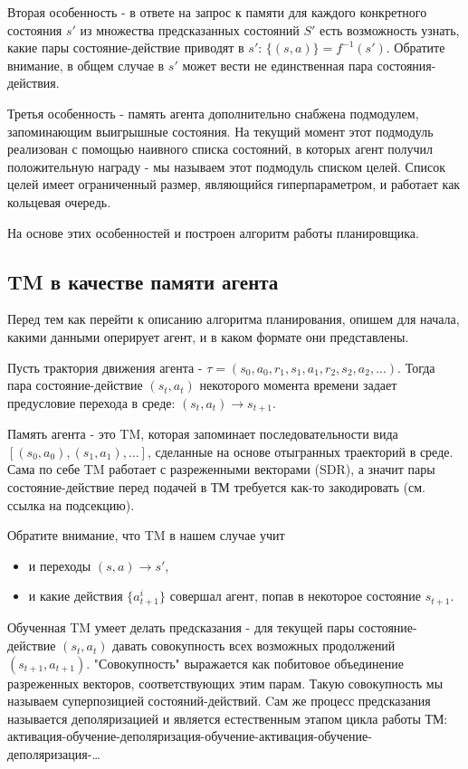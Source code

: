 \documentclass[a4paper]{article}
\begin{document}
Вторая особенность - в ответе на запрос к памяти для каждого конкретного состояния $s'$ из множества предсказанных состояний $S'$ есть возможность узнать, какие пары состояние-действие приводят в $s'$: $\{(s, a)\} = f^{-1}(s')$. Обратите внимание, в общем случае в $s'$ может вести не единственная пара состояния-действия.

Третья особенность - память агента дополнительно снабжена подмодулем, запоминающим выигрышные состояния. На текущий момент этот подмодуль реализован с помощью наивного списка состояний, в которых агент получил положительную награду - мы называем этот подмодуль списком целей. Список целей имеет ограниченный размер, являющийся гиперпараметром, и работает как кольцевая очередь.

На основе этих особенностей и построен алгоритм работы планировщика.

\subsection{TM в качестве памяти агента}

Перед тем как перейти к описанию алгоритма планирования, опишем для начала, какими данными оперирует агент, и в каком формате они представлены.

Пусть трактория движения агента - $\tau = (s_0, a_0, r_1, s_1, a_1, r_2, s_2, a_2, ...)$. Тогда пара состояние-действие $(s_t, a_t)$ некоторого момента времени задает предусловие перехода в среде: $(s_t, a_t) \rightarrow s_{t+1}$.

Память агента - это TM, которая запоминает последовательности вида $[(s_0, a_0), (s_1, a_1), \dots]$, сделанные на основе отыгранных траекторий в среде. Сама по себе TM работает с разреженными векторами (SDR), а значит пары состояние-действие перед подачей в ТМ требуется как-то закодировать (см. ссылка на подсекцию).

Обратите внимание, что TM в нашем случае учит
\begin{itemize}
  \item и переходы $(s, a) \rightarrow s'$,
  \item и какие действия $\{a^i_{t+1}\}$ совершал агент, попав в некоторое состояние $s_{t+1}$.
\end{itemize}

Обученная TM умеет делать предсказания - для текущей пары состояние-действие $(s_t, a_t)$ давать совокупность всех возможных продолжений $(s_{t+1}, a_{t+1})$. "Совокупность" выражается как побитовое объединение разреженных векторов, соответствующих этим парам. Такую совокупность мы называем суперпозицией состояний-действий. Cам же процесс предсказания называется деполяризацией и является естественным этапом цикла работы ТМ: активация-обучение-деполяризация-обучение-активация-обучение-деполяризация-\dots
\end{document}
